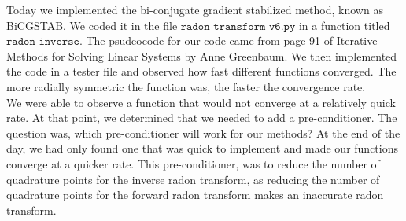 

Today we implemented the bi-conjugate gradient stabilized method, known as BiCGSTAB. We coded it in the file $\texttt{radon\_transform\_v6.py}$ in a function titled $\texttt{radon\_inverse}$. The psudeocode for our code came from page 91 of Iterative Methods for Solving Linear Systems by Anne Greenbaum. We then implemented the code in a tester file and observed how fast different functions converged. The more radially symmetric the function was, the faster the convergence rate. \\
We were able to observe a function that would not converge at a relatively quick rate. At that point, we determined that we needed to add a pre-conditioner. The question was, which pre-conditioner will work for our methods? At the end of the day, we had only found one that was quick to implement and made our functions converge at a quicker rate. This pre-conditioner, was to reduce the number of quadrature points for the inverse radon transform, as reducing the number of quadrature points for the forward radon transform makes an inaccurate radon transform. 